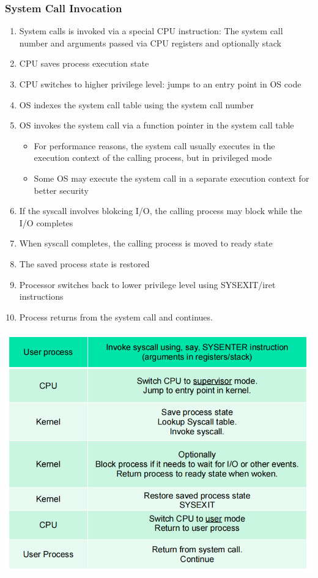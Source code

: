 \documentclass[12pt]{article}
\begin{document}
\subsubsection{System Call Invocation}
\begin{enumerate}
    \item System calls is invoked via a special CPU instruction: The system call number and arguments passed via CPU registers and optionally stack
    \item CPU saves process execution state
    \item CPU switches to higher privilege level: jumps to an entry point in OS code
    \item OS indexes the system call table using the system call number
    \item OS invokes the system call via a function pointer in the system call table \begin{itemize}
        \item For performance reasons, the system call usually executes in the execution context of the calling process, but in privileged mode
        \item Some OS may execute the system call in a separate execution context for better security
    \end{itemize}
    \item If the syscall involves blokcing I/O, the calling process may block while the I/O completes
    \item When syscall completes, the calling process is moved to ready state
    \item The saved process state is restored
    \item Processor switches back to lower privilege level using SYSEXIT/iret instructions
    \item Process returns from the system call and continues.
\end{enumerate}
\includegraphics[width=\textwidth]{SystemCallExecution.png}
\end{document}
